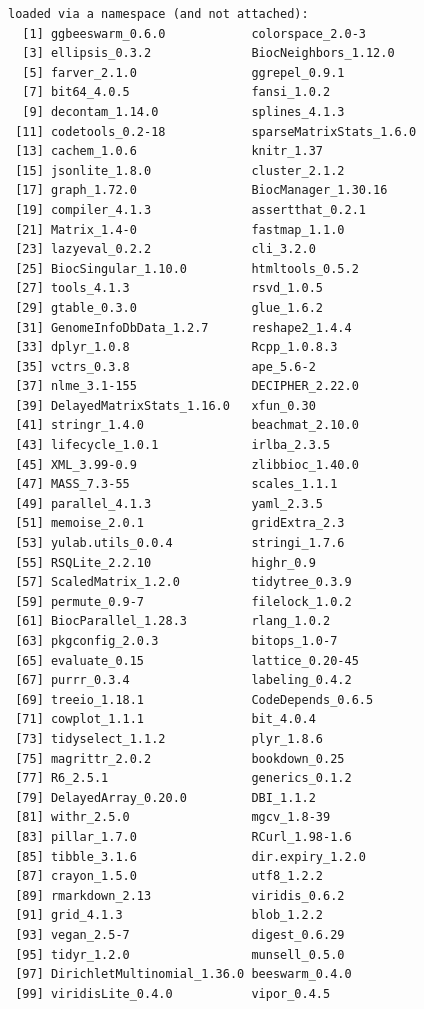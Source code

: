 \documentclass[
]{book}
\begin{document}
\begin{verbatim}
loaded via a namespace (and not attached):
  [1] ggbeeswarm_0.6.0            colorspace_2.0-3           
  [3] ellipsis_0.3.2              BiocNeighbors_1.12.0       
  [5] farver_2.1.0                ggrepel_0.9.1              
  [7] bit64_4.0.5                 fansi_1.0.2                
  [9] decontam_1.14.0             splines_4.1.3              
 [11] codetools_0.2-18            sparseMatrixStats_1.6.0    
 [13] cachem_1.0.6                knitr_1.37                 
 [15] jsonlite_1.8.0              cluster_2.1.2              
 [17] graph_1.72.0                BiocManager_1.30.16        
 [19] compiler_4.1.3              assertthat_0.2.1           
 [21] Matrix_1.4-0                fastmap_1.1.0              
 [23] lazyeval_0.2.2              cli_3.2.0                  
 [25] BiocSingular_1.10.0         htmltools_0.5.2            
 [27] tools_4.1.3                 rsvd_1.0.5                 
 [29] gtable_0.3.0                glue_1.6.2                 
 [31] GenomeInfoDbData_1.2.7      reshape2_1.4.4             
 [33] dplyr_1.0.8                 Rcpp_1.0.8.3               
 [35] vctrs_0.3.8                 ape_5.6-2                  
 [37] nlme_3.1-155                DECIPHER_2.22.0            
 [39] DelayedMatrixStats_1.16.0   xfun_0.30                  
 [41] stringr_1.4.0               beachmat_2.10.0            
 [43] lifecycle_1.0.1             irlba_2.3.5                
 [45] XML_3.99-0.9                zlibbioc_1.40.0            
 [47] MASS_7.3-55                 scales_1.1.1               
 [49] parallel_4.1.3              yaml_2.3.5                 
 [51] memoise_2.0.1               gridExtra_2.3              
 [53] yulab.utils_0.0.4           stringi_1.7.6              
 [55] RSQLite_2.2.10              highr_0.9                  
 [57] ScaledMatrix_1.2.0          tidytree_0.3.9             
 [59] permute_0.9-7               filelock_1.0.2             
 [61] BiocParallel_1.28.3         rlang_1.0.2                
 [63] pkgconfig_2.0.3             bitops_1.0-7               
 [65] evaluate_0.15               lattice_0.20-45            
 [67] purrr_0.3.4                 labeling_0.4.2             
 [69] treeio_1.18.1               CodeDepends_0.6.5          
 [71] cowplot_1.1.1               bit_4.0.4                  
 [73] tidyselect_1.1.2            plyr_1.8.6                 
 [75] magrittr_2.0.2              bookdown_0.25              
 [77] R6_2.5.1                    generics_0.1.2             
 [79] DelayedArray_0.20.0         DBI_1.1.2                  
 [81] withr_2.5.0                 mgcv_1.8-39                
 [83] pillar_1.7.0                RCurl_1.98-1.6             
 [85] tibble_3.1.6                dir.expiry_1.2.0           
 [87] crayon_1.5.0                utf8_1.2.2                 
 [89] rmarkdown_2.13              viridis_0.6.2              
 [91] grid_4.1.3                  blob_1.2.2                 
 [93] vegan_2.5-7                 digest_0.6.29              
 [95] tidyr_1.2.0                 munsell_0.5.0              
 [97] DirichletMultinomial_1.36.0 beeswarm_0.4.0             
 [99] viridisLite_0.4.0           vipor_0.4.5                
\end{verbatim}
\end{document}
